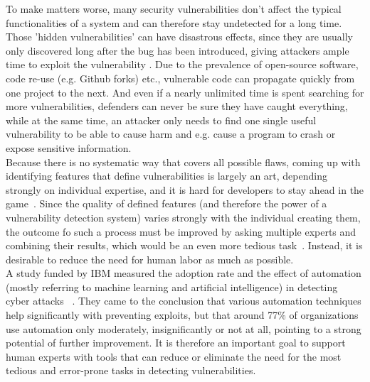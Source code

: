 \documentclass[
	a4paper,
	pagesize,
	pdftex,
	12pt,
	twoside, %
	BCOR=5mm, %
	ngerman,
	fleqn,
	final,
	]{scrartcl}
\begin{document}
To make matters worse, many security vulnerabilities don't affect the typical functionalities of a system and can therefore stay undetected for a long time. Those 'hidden vulnerabilities' can have disastrous effects, since they are usually only discovered long after the bug has been introduced, giving attackers ample time to exploit the vulnerability \cite{Wijayasekara.2012,Ma.2017,Russell.2018}. Due to the prevalence of open-source software, code re-use (e.g. Github forks) etc., vulnerable code can propagate quickly from one project to the next. And even if a nearly unlimited time is spent searching for more vulnerabilities, defenders can never be sure they have caught everything, while at the same time, an attacker only needs to find one single useful vulnerability to be able to cause harm and e.g. cause a program to crash or expose sensitive information.\\
Because there is no systematic way that covers all possible flaws, coming up with identifying features that define vulnerabilities is largely an art, depending strongly on individual expertise, and it is hard for developers to stay ahead in the game~\cite{Rolim.2018,Li.2018}. Since the quality of defined features (and therefore the power of a vulnerability detection system) varies strongly with the individual creating them, the outcome fo such a process must be improved by asking multiple experts and combining their results, which would be an even more tedious task~\cite{Li.2018}. Instead, it is desirable to reduce the need for human labor as much as possible.\\
A study funded by IBM measured the adoption rate and the effect of automation (mostly referring to machine learning and artificial intelligence) in detecting cyber attacks ~\cite{IBMNewsRoom.}. They came to the conclusion that various automation techniques help significantly with preventing exploits, but that around 77\% of organizations use automation only moderately, insignificantly or not at all, pointing to a strong potential of further improvement. It is therefore an important goal to support human experts with tools that can reduce or eliminate the need for the most tedious and error-prone tasks in detecting vulnerabilities.\\
\end{document}
